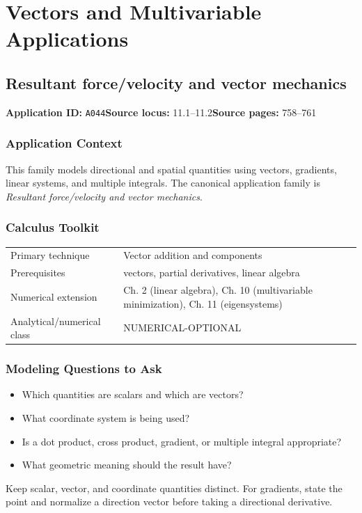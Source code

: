 \documentclass[11pt]{book}
\newcommand{\pid}[1]{\texttt{#1}}
\begin{document}
\part{Vectors and Multivariable Applications}
\chapter{Resultant force/velocity and vector mechanics}\label{app:A044}
\textbf{Application ID:} \pid{A044}\quad \textbf{Source locus:} 11.1–11.2\quad \textbf{Source pages:} 758–761
\section*{Application Context}
This family models directional and spatial quantities using vectors, gradients, linear systems, and multiple integrals. The canonical application family is \emph{Resultant force/velocity and vector mechanics}.
\section*{Calculus Toolkit}
\begin{tabularx}{\textwidth}{@{}lX@{}}\toprule
Primary technique & Vector addition and components \\
Prerequisites & vectors, partial derivatives, linear algebra \\
Numerical extension & Ch. 2 (linear algebra), Ch. 10 (multivariable minimization), Ch. 11 (eigensystems) \\
Analytical/numerical class & NUMERICAL-OPTIONAL \\
\bottomrule\end{tabularx}
\section*{Modeling Questions to Ask}\begin{itemize}
\item Which quantities are scalars and which are vectors?
\item What coordinate system is being used?
\item Is a dot product, cross product, gradient, or multiple integral appropriate?
\item What geometric meaning should the result have?
\end{itemize}
\begin{errorbox}Keep scalar, vector, and coordinate quantities distinct. For gradients, state the point and normalize a direction vector before taking a directional derivative.\end{errorbox}
\end{document}
